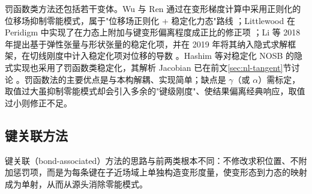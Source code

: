 \begin{remark}
  罚函数类方法还包括若干变体。Wu 与 Ren 通过在变形梯度计算中采用正则化的位移场抑制零能模式，属于"位移场正则化 + 稳定化力态"路线 \cite{WuRen2015}；Littlewood 在 Peridigm 中实现了在力态上附加与键变形偏离程度成正比的修正项 \cite{Littlewood2015}；Li 等 2018 年提出基于弹性张量与形状张量的稳定化项，并在 2019 年将其纳入隐式求解框架，在切线刚度中计入稳定化项对位移的导数 \cite{Li2018,Li2019}。Hashim 等对稳定化 NOSB 的隐式实现也采用了罚函数类稳定化，其解析 Jacobian 已在前文\ref{sec:nl-tangent}节讨论 \cite{Hashim2020}。罚函数法的主要优点是与本构解耦、实现简单；缺点是 $\gamma$（或 $\alpha$）需标定，取值过大虽抑制零能模式却会引入多余的"键级刚度"、使结果偏离经典响应，取值过小则修正不足。
\end{remark}

\subsection{键关联方法}\label{sec:bond-associated}

键关联（bond-associated）方法的思路与前两类根本不同：不修改求积位置、不附加惩罚项，而是为每条键在子近场域上单独构造变形度量，使变形态到力态的映射成为单射，从而从源头消除零能模式。


